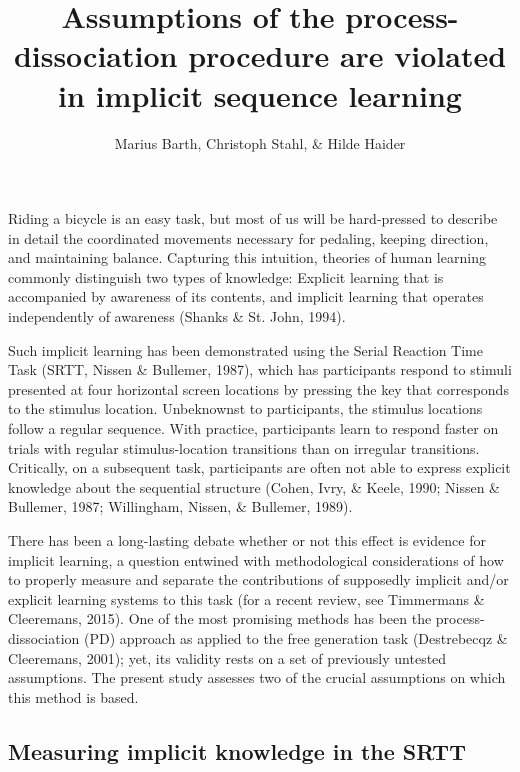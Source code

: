 \documentclass[floatsintext,doc]{apa6}
\title{Assumptions of the process-dissociation procedure are violated in
implicit sequence learning}
\author{Marius Barth\textsuperscript{}, Christoph Stahl\textsuperscript{}, \& Hilde Haider\textsuperscript{}}
\affiliation{
    \vspace{0.5cm}
          \textsuperscript{} University of Cologne  }
\theoremstyle{definition}
\theoremstyle{definition}
\theoremstyle{definition}
\theoremstyle{remark}
\begin{document}
\maketitle

\setcounter{secnumdepth}{0}



Riding a bicycle is an easy task, but most of us will be hard-pressed to
describe in detail the coordinated movements necessary for pedaling,
keeping direction, and maintaining balance. Capturing this intuition,
theories of human learning commonly distinguish two types of knowledge:
Explicit learning that is accompanied by awareness of its contents, and
implicit learning that operates independently of awareness (Shanks \&
St. John, 1994).

Such implicit learning has been demonstrated using the Serial Reaction
Time Task (SRTT, Nissen \& Bullemer, 1987), which has participants
respond to stimuli presented at four horizontal screen locations by
pressing the key that corresponds to the stimulus location. Unbeknownst
to participants, the stimulus locations follow a regular sequence. With
practice, participants learn to respond faster on trials with regular
stimulus-location transitions than on irregular transitions. Critically,
on a subsequent task, participants are often not able to express
explicit knowledge about the sequential structure (Cohen, Ivry, \&
Keele, 1990; Nissen \& Bullemer, 1987; Willingham, Nissen, \& Bullemer,
1989).

There has been a long-lasting debate whether or not this effect is
evidence for implicit learning, a question entwined with methodological
considerations of how to properly measure and separate the contributions
of supposedly implicit and/or explicit learning systems to this task
(for a recent review, see Timmermans \& Cleeremans, 2015). One of the
most promising methods has been the process-dissociation (PD) approach
as applied to the free generation task (Destrebecqz \& Cleeremans,
2001); yet, its validity rests on a set of previously untested
assumptions. The present study assesses two of the crucial assumptions
on which this method is based.

\subsection{Measuring implicit knowledge in the
SRTT}\label{measuring-implicit-knowledge-in-the-srtt}
\end{document}

